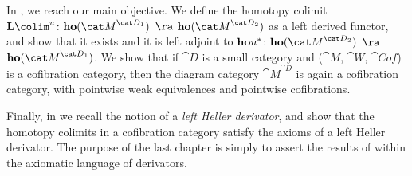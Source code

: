 In , we reach our main objective. We define the homotopy colimit ${\bf L}\colim^u \colon {\bf ho}({\cat M}^{{\cat D}_1})$ $\ra$ ${\bf ho}({\cat M}^{{\cat D}_2})$ as a left derived functor, and show that it exists and it is left adjoint to ${\bf ho}u^* \colon {\bf ho}({\cat M}^{{\cat D}_2})$ $\ra$ ${\bf ho}({\cat M}^{{\cat D}_1})$. We show that if ${\cat D}$ is a small category and (${\cat M}$, ${\cat W}$, ${\cat Cof}$) is a cofibration category, then the diagram category ${\cat M}^{\cat D}$ is again a cofibration category, with pointwise weak equivalences and pointwise cofibrations.

Finally, in  we recall the notion of a {\it left Heller derivator}, and show that the homotopy colimits in a cofibration category satisfy the axioms of a left Heller derivator. The purpose of the last chapter is simply to assert the results of  within the axiomatic language of derivators.

